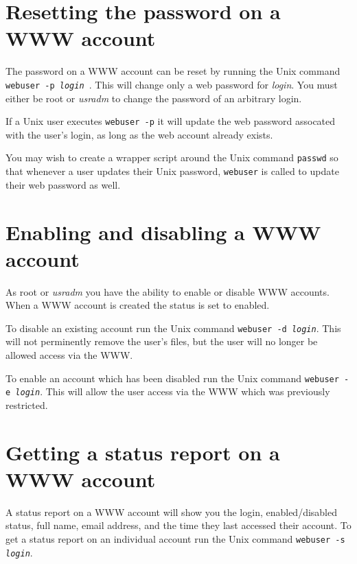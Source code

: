 \documentclass[twoside]{report}
\begin{document}
   \section{Resetting the password on a WWW account}
      The password on a WWW account can be reset by running the Unix command
      {\tt webuser -p {\em login} }.  This will change only a 
      web password for {\em login}. You must either be root or {\em usradm} to 
      change the password of an arbitrary login.

      If a Unix user executes {\tt webuser -p} it will update 
      the web password assocated with the user's login, as long as the 
      web account already exists.
      
      You may wish to create a wrapper script around the Unix command 
      {\tt passwd} so that whenever a user updates their Unix password,
      {\tt webuser} is called to update their web password 
      as well.

   \section{Enabling and disabling a WWW account}
      As root or {\em usradm} you have the ability to 
      enable or disable WWW accounts.  When a WWW account is created the 
      status is set to enabled.

      To disable an existing account run the Unix command
      {\tt webuser -d {\em login}}.  This will not 
      perminently remove the user's files, but the user will no longer 
      be allowed access via the WWW.

      To enable an account which has been disabled run the Unix command
      {\tt webuser -e {\em login}}.  This will allow the 
      user access via the WWW which was previously restricted.
      

   \section{Getting a status report on a WWW account}
      A status report on a WWW account will show you the login, 
      enabled/disabled status, full name, email address, and the time they
      last accessed their account.  To get a status report on an individual
      account run the Unix command 
      {\tt webuser -s {\em login}}.  
      
\end{document}
